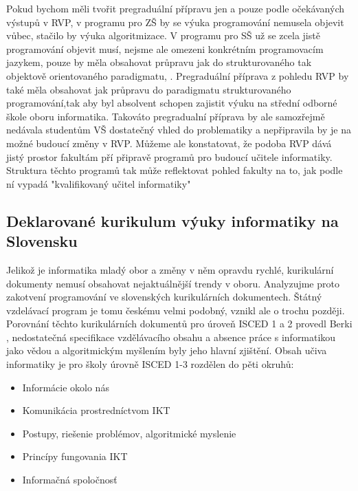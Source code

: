 \documentclass[FP,DP]{tulthesis}
\begin{document}
{{Pokud bychom měli tvořit pregraduální přípravu jen a pouze podle  očekávaných výstupů v RVP, v programu pro ZŠ by se výuka programování  nemusela objevit vůbec, stačilo by výuka algoritmizace. V programu pro SŠ už se zcela jistě programování objevit musí, nejsme ale omezeni konkrétním programovacím jazykem, pouze by měla obsahovat průpravu jak do strukturovaného tak objektově orientovaného paradigmatu, . Pregraduální příprava z pohledu RVP by také měla obsahovat jak průpravu do paradigmatu strukturovaného programování,tak aby byl absolvent schopen zajistit výuku na střední odborné škole oboru informatika. Takováto pregradualní příprava by ale samozřejmě nedávala studentům VŠ dostatečný vhled do problematiky a nepřipravila by je na možné budoucí změny v RVP. Můžeme ale konstatovat, že podoba RVP dává jistý prostor fakultám pří připravě programů pro budoucí učitele informatiky. Struktura těchto programů tak může reflektovat pohled fakulty na to, jak podle ní vypadá "kvalifikovaný učitel informatiky" 
\subsection{Deklarované kurikulum výuky informatiky na Slovensku}
Jelikož je informatika mladý obor a změny v něm opravdu rychlé, kurikulární dokumenty nemusí obsahovat nejaktuálnější trendy v oboru. Analyzujme  proto zakotvení programování ve slovenských kurikulárních dokumentech. Štátný vzdelávací program je tomu českému velmi podobný, vznikl ale o trochu později. Porovnání těchto kurikulárních dokumentů  pro úroveň ISCED 1 a 2 provedl Berki \citeyearpar{berki2011}, nedostatečná specifikace vzdělávacího obsahu a absence práce s informatikou jako vědou a algoritmickým myšlením byly jeho  hlavní zjištění. \citep[s.~36]{berki2011} Obsah učiva informatiky je pro školy úrovně ISCED 1-3 rozdělen do pěti okruhů:
\begin{itemize}
\setlength\itemsep{0.01em}
  	\item Informácie okolo nás
	\item Komunikácia prostredníctvom IKT
  	\item Postupy, riešenie problémov, algoritmické myslenie
	\item Princípy fungovania IKT
	\item Informačná spoločnosť
\end{itemize}

}}
\end{document}
